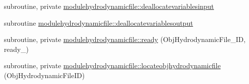 \begin{DoxyCompactItemize}
\item 
subroutine, private \mbox{\hyperlink{namespacemodulehydrodynamicfile_a44ff390b68de3bb94294a2fe2d251814}{modulehydrodynamicfile\+::deallocatevariablesinput}}
\item 
subroutine \mbox{\hyperlink{namespacemodulehydrodynamicfile_aa952fb593bad5ccc173888f38e59a6f8}{modulehydrodynamicfile\+::deallocatevariablesoutput}}
\item 
subroutine, private \mbox{\hyperlink{namespacemodulehydrodynamicfile_ab74a3df233aec6594db3ce069b1a2c25}{modulehydrodynamicfile\+::ready}} (Obj\+Hydrodynamic\+File\+\_\+\+ID, ready\+\_\+)
\item 
subroutine, private \mbox{\hyperlink{namespacemodulehydrodynamicfile_aa662fd4d0a1262940a320a6801dbe247}{modulehydrodynamicfile\+::locateobjhydrodynamicfile}} (Obj\+Hydrodynamic\+File\+ID)
\end{DoxyCompactItemize}
